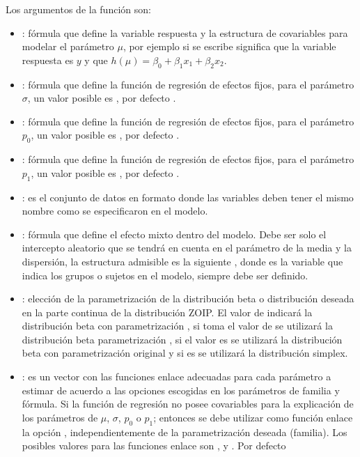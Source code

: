Los argumentos de la funci\'{o}n  son:


\begin{itemize}[noitemsep, nolistsep]

\item {}: f\'{o}rmula que define la variable respuesta y la estructura de covariables para modelar el par\'{a}metro $\mu$, por ejemplo si se escribe  significa que la variable respuesta es $y$ y que $h(\mu)=\beta_0 + \beta_1 x_1 + \beta_2 x_2$.
\item {}: f\'{o}rmula que define la funci\'{o}n de regresi\'{o}n de efectos fijos, para el par\'{a}metro $\sigma$, un valor posible es , por defecto .
\item {}: f\'{o}rmula que define la funci\'{o}n de regresi\'{o}n de efectos fijos, para el par\'{a}metro $p_0$, un valor posible es , por defecto .
\item {}: f\'{o}rmula que define la funci\'{o}n de regresi\'{o}n de efectos fijos, para el par\'{a}metro $p_1$, un valor posible es , por defecto .
\item {}: es el conjunto de datos en formato  donde las variables deben tener el mismo nombre como se especificaron en el modelo.
\item {}: f\'{o}rmula que define el efecto mixto dentro del modelo. Debe ser solo el intercepto aleatorio que se tendr\'{a} en cuenta en el par\'{a}metro de la media y la dispersi\'{o}n, la estructura admisible es la siguiente , donde  es la variable que indica los grupos o sujetos en el modelo, siempre debe ser definido.
\item {}: elecci\'{o}n de la parametrizaci\'{o}n de la distribuci\'{o}n beta o distribuci\'{o}n deseada en la parte continua de la distribuci\'{o}n ZOIP. El valor de  indicar\'{a} la distribuci\'{o}n beta con parametrizaci\'{o}n \cite{Stasinopoulos2}, si toma el valor de  se utilizar\'{a} la distribuci\'{o}n beta parametrizaci\'{o}n \cite{Ferrari2}, si el valor es  se utilizar\'{a} la distribuci\'{o}n beta con parametrizaci\'{o}n original y si es  se utilizar\'{a} la distribuci\'{o}n simplex.
\item {}: es un vector con las funciones enlace adecuadas para cada par\'{a}metro a estimar de acuerdo a las opciones escogidas en los par\'{a}metros de familia y f\'{o}rmula. Si la funci\'{o}n de regresi\'{o}n no posee covariables para la explicaci\'{o}n de los par\'{a}metros de $\mu$, $\sigma$, $p_0$ o $p_1$; entonces se debe utilizar como funci\'{o}n enlace la opci\'{o}n , independientemente de la parametrizaci\'{o}n deseada (familia). Los posibles valores para las funciones enlace son ,  y . Por defecto \\

\end{itemize}
